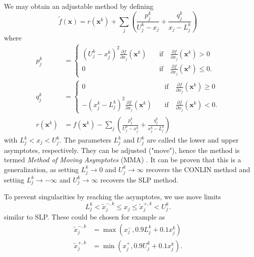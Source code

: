 We may obtain an adjustable method by defining
\begin{equation}
    \tilde{f}(\mathbf{x}) = r(\mathbf{x}^k) + \sum_j \left( \frac{p_{j}^k}{U^k_j-x_j} + \frac{q_{j}^k}{x_j-L^k_j} \right) 
    \label{eq:mma_start}
\end{equation}
where
\begin{align}
    p_{j}^k &= 
    \begin{cases}
        (U^k_j-x^k_j)^2 \frac{\partial f}{\partial x_j} (\mathbf{x}^k)  &\quad \text{if} \quad \frac{\partial f}{\partial x_j} (\mathbf{x}^k) > 0 \\
        0 &\quad \text{if} \quad \frac{\partial f}{\partial x_j} (\mathbf{x}^k) \le 0.
    \end{cases} \\ 
    q_{j}^k &= 
    \begin{cases}
         0 &\quad \text{if} \quad \frac{\partial f}{\partial x_j} (\mathbf{x}^k) \ge 0 \\
        - (x^k_j-L^k_j)^2 \frac{\partial f}{\partial x_j} (\mathbf{x}^k) &\quad \text{if} \quad \frac{\partial f}{\partial x_j} (\mathbf{x}^k) < 0.
    \end{cases} \\ 
    r(\mathbf{x}^k) &= f(\mathbf{x}^k) - \sum_j \left(\frac{p_{j}^k}{U^k_j-x^k_j} + \frac{q_{j}^k}{x^k_j-L^k_j}  \right)
    \label{eq:mma_end}
\end{align}
with $L^k_j < x_j < U^k_j$. The parameters $L^k_j$ and $U_j^k$ are called the lower and upper asymptotes, respectively. They can be adjusted ("move"), hence the method is termed \emph{Method of Moving Asymptotes} (MMA) \cite{Svanberg1987}. It can be proven that this is a generalization, as setting $L^k_j \rightarrow 0$ and $U^k_j \rightarrow \infty$ recovers the CONLIN method and setting  $L^k_j \rightarrow -\infty$ and $U^k_j \rightarrow \infty$ recovers the SLP method.

To prevent singularities by reaching the asymptotes, we use move limits 
\begin{equation}
    L^k_j < \tilde{x}_j^{-,k} \le x_j \le \tilde{x}_j^{+,k} < U_j^k.
\end{equation}
similar to SLP. These could be chosen for example as 
\begin{align}
    \tilde{x}_j^{-,k} &= \max(x^-_j,  0.9 L_j^k + 0.1 x_j^k) \\
    \tilde{x}_j^{+,k} &= \min(x^+_j, 0.9 U_j^k + 0.1 x_j^k).
    \label{eq:mma_move_limits}
\end{align}


